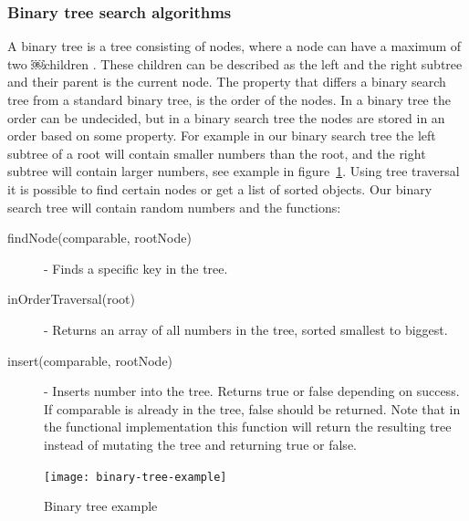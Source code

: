 \documentclass {article}
\begin{document}
\subsubsection{Binary tree search algorithms}
\label{sec:binary-tree}
A binary tree is a tree consisting of nodes, where a node can have a maximum of two ￼children \cite{weiss}. These children can be described as the left and the right subtree and their parent is the current node. The property that differs a binary search tree from a standard binary tree, is the order of the nodes. In a binary tree the order can be undecided, but in a binary search tree the nodes are stored in an order based on some property. For example in our binary search tree the left subtree of a root will contain smaller numbers than the root, and the right subtree will contain larger numbers, see example in figure~\ref{fig:binary-tree-example}. Using tree traversal it is possible to find certain nodes or get a list of sorted objects. Our binary search tree will contain random numbers and the functions:
\begin{description}
\item [findNode(comparable, rootNode)] - Finds a specific key in the tree.
\item [inOrderTraversal(root)] - Returns an array of all numbers in the tree, sorted smallest to biggest.
\item [insert(comparable, rootNode)] - Inserts number into the tree. Returns true or false depending on success. If comparable is already in the tree, false should be returned. Note that in the functional implementation this function will return the resulting tree instead of mutating the tree and returning true or false.
\end{description}

\begin{figure}[H]
\texttt{[image: binary-tree-example]}


\caption {Binary tree example}
\label{fig:binary-tree-example}
\end {figure}
\end{document}
